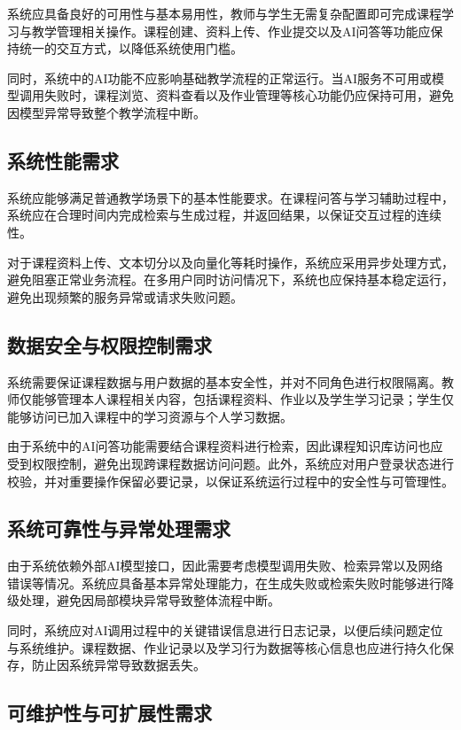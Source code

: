 \documentclass[12pt,a4paper,oneside]{ctexbook}
\numberwithin{equation}{chapter}
\begin{document}
系统应具备良好的可用性与基本易用性，教师与学生无需复杂配置即可完成课程学习与教学管理相关操作。课程创建、资料上传、作业提交以及AI问答等功能应保持统一的交互方式，以降低系统使用门槛。

同时，系统中的AI功能不应影响基础教学流程的正常运行。当AI服务不可用或模型调用失败时，课程浏览、资料查看以及作业管理等核心功能仍应保持可用，避免因模型异常导致整个教学流程中断。

\subsection{系统性能需求}

系统应能够满足普通教学场景下的基本性能要求。在课程问答与学习辅助过程中，系统应在合理时间内完成检索与生成过程，并返回结果，以保证交互过程的连续性。

对于课程资料上传、文本切分以及向量化等耗时操作，系统应采用异步处理方式，避免阻塞正常业务流程。在多用户同时访问情况下，系统也应保持基本稳定运行，避免出现频繁的服务异常或请求失败问题。

\subsection{数据安全与权限控制需求}

系统需要保证课程数据与用户数据的基本安全性，并对不同角色进行权限隔离。教师仅能够管理本人课程相关内容，包括课程资料、作业以及学生学习记录；学生仅能够访问已加入课程中的学习资源与个人学习数据。

由于系统中的AI问答功能需要结合课程资料进行检索，因此课程知识库访问也应受到权限控制，避免出现跨课程数据访问问题。此外，系统应对用户登录状态进行校验，并对重要操作保留必要记录，以保证系统运行过程中的安全性与可管理性。

\subsection{系统可靠性与异常处理需求}

由于系统依赖外部AI模型接口，因此需要考虑模型调用失败、检索异常以及网络错误等情况。系统应具备基本异常处理能力，在生成失败或检索失败时能够进行降级处理，避免因局部模块异常导致整体流程中断。

同时，系统应对AI调用过程中的关键错误信息进行日志记录，以便后续问题定位与系统维护。课程数据、作业记录以及学习行为数据等核心信息也应进行持久化保存，防止因系统异常导致数据丢失。

\subsection{可维护性与可扩展性需求}
\end{document}
